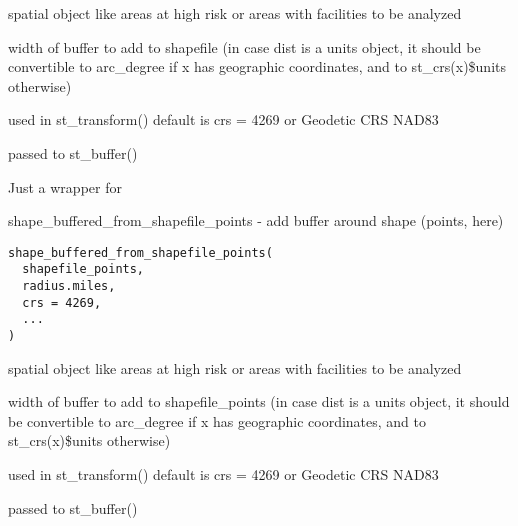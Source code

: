 \documentclass[a4paper]{book}
\begin{document}
%
\begin{Arguments}
\begin{ldescription}
\item[\code{shapefile}] spatial object like areas at high risk or areas with facilities to be analyzed

\item[\code{radius.miles}] width of buffer to add to shapefile
(in case dist is a units object, it should be
convertible to arc\_degree if x has geographic coordinates,
and to st\_crs(x)\$units otherwise)

\item[\code{crs}] used in st\_transform()  default is crs = 4269 or Geodetic CRS NAD83

\item[\code{...}] passed to st\_buffer()
\end{ldescription}
\end{Arguments}
%
\begin{Details}\relax
Just a wrapper for 
\end{Details}
%
\begin{SeeAlso}\relax
{}  
\end{SeeAlso}
%
\begin{Description}\relax
shape\_buffered\_from\_shapefile\_points - add buffer around shape (points, here)
\end{Description}
%
\begin{Usage}
\begin{verbatim}
shape_buffered_from_shapefile_points(
  shapefile_points,
  radius.miles,
  crs = 4269,
  ...
)
\end{verbatim}
\end{Usage}
%
\begin{Arguments}
\begin{ldescription}
\item[\code{shapefile\_points}] spatial object like areas at high risk or areas with facilities to be analyzed

\item[\code{radius.miles}] width of buffer to add to shapefile\_points
(in case dist is a units object, it should be
convertible to arc\_degree if x has geographic coordinates,
and to st\_crs(x)\$units otherwise)

\item[\code{crs}] used in st\_transform()  default is crs = 4269 or Geodetic CRS NAD83

\item[\code{...}] passed to st\_buffer()
\end{ldescription}
\end{Arguments}
\end{document}
